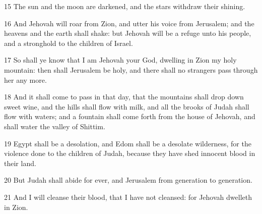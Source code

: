 \par 15 The sun and the moon are darkened, and the stars withdraw their shining.
\par 16 And Jehovah will roar from Zion, and utter his voice from Jerusalem; and the heavens and the earth shall shake: but Jehovah will be a refuge unto his people, and a stronghold to the children of Israel.
\par 17 So shall ye know that I am Jehovah your God, dwelling in Zion my holy mountain: then shall Jerusalem be holy, and there shall no strangers pass through her any more.
\par 18 And it shall come to pass in that day, that the mountains shall drop down sweet wine, and the hills shall flow with milk, and all the brooks of Judah shall flow with waters; and a fountain shall come forth from the house of Jehovah, and shall water the valley of Shittim.
\par 19 Egypt shall be a desolation, and Edom shall be a desolate wilderness, for the violence done to the children of Judah, because they have shed innocent blood in their land.
\par 20 But Judah shall abide for ever, and Jerusalem from generation to generation.
\par 21 And I will cleanse their blood, that I have not cleansed: for Jehovah dwelleth in Zion.

